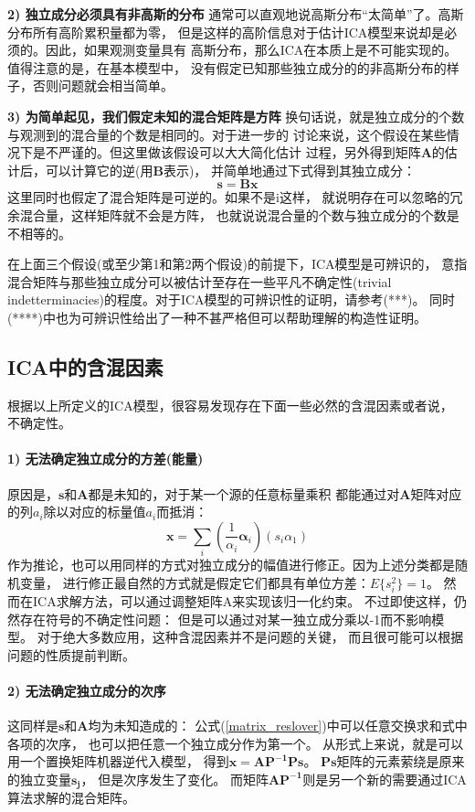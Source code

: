 \textbf{2) 独立成分必须具有非高斯的分布}
通常可以直观地说高斯分布“太简单”了。高斯分布所有高阶累积量都为零，
但是这样的高阶信息对于估计ICA模型来说却是必须的。因此，如果观测变量具有
高斯分布，那么ICA在本质上是不可能实现的。值得注意的是，在基本模型中，
没有假定已知那些独立成分的的非高斯分布的样子，否则问题就会相当简单。

\textbf{3) 为简单起见，我们假定未知的混合矩阵是方阵}
换句话说，就是独立成分的个数与观测到的混合量的个数是相同的。对于进一步的
讨论来说，这个假设在某些情况下是不严谨的。但这里做该假设可以大大简化估计
过程，另外得到矩阵$\bm{A}$的估计后，可以计算它的逆(用$\bm{B}$表示)，
并简单地通过下式得到其独立成分：
\begin{equation}
\bm{s}=\bm{B}\bm{x}
\end{equation}
这里同时也假定了混合矩阵是可逆的。如果不是i这样，
就说明存在可以忽略的冗余混合量，这样矩阵就不会是方阵，
也就说说混合量的个数与独立成分的个数是不相等的。

在上面三个假设(或至少第1和第2两个假设)的前提下，ICA模型是可辨识的，
意指混合矩阵与那些独立成分可以被估计至存在一些平凡不确定性(trivial indetterminacies)的程度。对于ICA模型的可辨识性的证明，请参考(***)。
同时(****)中也为可辨识性给出了一种不甚严格但可以帮助理解的构造性证明。
      
\subsection{ICA中的含混因素}
根据以上所定义的ICA模型，很容易发现存在下面一些必然的含混因素或者说，
不确定性。
\paragraph*{1) 无法确定独立成分的方差(能量)}
原因是，$\bm{s}$和$\bm{A}$都是未知的，对于某一个源的任意标量乘积
都能通过对$\bm{A}$矩阵对应的列$a_i$除以对应的标量值$a_i$而抵消：
\begin{equation}
\bm{x}=\sum_{i} (\frac{1}{{\alpha}_i} \bm{\alpha}_i)(s_i {\alpha}_1)
\end{equation}
作为推论，也可以用同样的方式对独立成分的幅值进行修正。因为上述分类都是随机变量，
进行修正最自然的方式就是假定它们都具有单位方差：$E\{s_i^2\}=1$。
然而在ICA求解方法，可以通过调整矩阵A来实现该归一化约束。
不过即使这样，仍然存在符号的不确定性问题：
但是可以通过对某一独立成分乘以-1而不影响模型。
对于绝大多数应用，这种含混因素并不是问题的关键，
而且很可能可以根据问题的性质提前判断。

\paragraph*{2) 无法确定独立成分的次序}
这同样是$\bm{s}$和$\bm{A}$均为未知造成的：
公式(\ref{matrix_reslover})中可以任意交换求和式中各项的次序，
也可以把任意一个独立成分作为第一个。
从形式上来说，就是可以用一个置换矩阵机器逆代入模型，
得到$\bm{x=AP^{-1}Ps}$。
$\bm{Ps}$矩阵的元素萦绕是原来的独立变量$\bm{s_j}$，
但是次序发生了变化。
而矩阵$\bm{AP^{-1}}$则是另一个新的需要通过ICA算法求解的混合矩阵。
 
